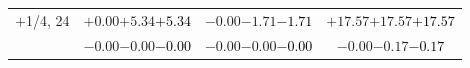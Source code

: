 \documentclass[compress]{beamer}
\begin{document}
\begin{frame}
\begin{tabular}{r | c | c | c}
$+$1/4, 24 & $+0.00$\hspace{0.1 cm}$+5.34$\hspace{0.1 cm}\textcolor{black}{$+5.34$} & $-0.00$\hspace{0.1 cm}$-1.71$\hspace{0.1 cm}\textcolor{black}{$-1.71$} & $+17.57$\hspace{0.1 cm}$+17.57$\hspace{0.1 cm}\textcolor{black}{$+17.57$} \\
           & $-0.00$\hspace{0.1 cm}$-0.00$\hspace{0.1 cm}\textcolor{black}{$-0.00$} & $-0.00$\hspace{0.1 cm}$-0.00$\hspace{0.1 cm}\textcolor{black}{$-0.00$} & $-0.00$\hspace{0.1 cm}$-0.17$\hspace{0.1 cm}\textcolor{black}{$-0.17$} \\
\end{tabular}
\end{frame}
\end{document}
